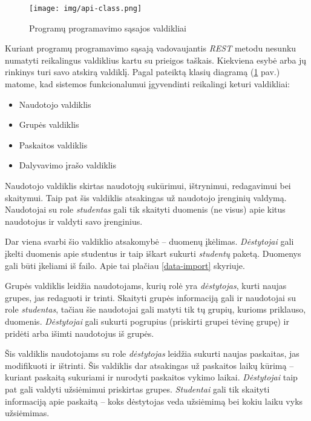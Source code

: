 \documentclass{VUMIFPSkursinis}
\begin{document}
\begin{figure}[H]
	\centering
	\texttt{[image: img/api-class.png]}
	\caption{Programų programavimo sąsajos valdikliai}
	\label{img:api-class-diagram}
\end{figure}

Kuriant programų programavimo sąsają vadovaujantis \textit{REST} metodu nesunku numatyti reikalingus valdiklius kartu su prieigos taškais. Kiekviena esybė arba jų rinkinys turi savo atskirą valdiklį. Pagal pateiktą klasių diagramą (\ref{img:api-class-diagram} pav.) matome, kad sistemos funkcionalumui įgyvendinti reikalingi keturi valdikliai:

\begin{itemize}
    \item Naudotojo valdiklis
    \item Grupės valdiklis
    \item Paskaitos valdiklis
    \item Dalyvavimo įrašo valdiklis
\end{itemize}


Naudotojo valdiklis skirtas naudotojų sukūrimui, ištrynimui, redagavimui bei skaitymui. Taip pat šis valdiklis atsakingas už naudotojo įrenginių valdymą. Naudotojai su role \textit{studentas} gali tik skaityti duomenis (ne visus) apie kitus naudotojus ir valdyti savo įrenginius.

Dar viena svarbi šio valdiklio atsakomybė – duomenų įkėlimas. \textit{Dėstytojai} gali įkelti duomenis apie studentus ir taip iškart sukurti \textit{studentų} paketą. Duomenys gali būti įkeliami iš failo. Apie tai plačiau \ref{data-import} skyriuje.


Grupės valdiklis leidžia naudotojams, kurių rolė yra \textit{dėstytojas}, kurti naujas grupes, jas redaguoti ir trinti. Skaityti grupės informaciją gali ir naudotojai su role \textit{studentas}, tačiau šie naudotojai gali matyti tik tų grupių, kurioms priklauso, duomenis. \textit{Dėstytojai} gali sukurti pogrupius (priskirti grupei tėvinę grupę) ir pridėti arba išimti naudotojus iš grupės.


Šis valdiklis naudotojams su role \textit{dėstytojas} leidžia sukurti naujas paskaitas, jas modifikuoti ir ištrinti. Šis valdiklis dar atsakingas už paskaitos laikų kūrimą – kuriant paskaitą sukuriami ir nurodyti paskaitos vykimo laikai. \textit{Dėstytojai} taip pat gali valdyti užsiėmimui priskirtas grupes. \textit{Studentai} gali tik skaityti informaciją apie paskaitą – koks dėstytojas veda užsiėmimą bei kokiu laiku vyks užsiėmimas.
\end{document}
